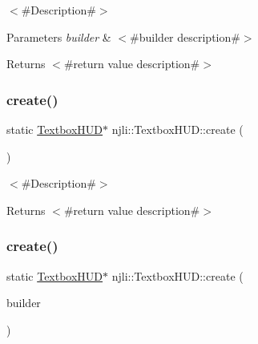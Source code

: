 $<$\#\+Description\#$>$


\begin{DoxyParams}{Parameters}
{\em builder} & $<$\#builder description\#$>$\\
\hline
\end{DoxyParams}
\begin{DoxyReturn}{Returns}
$<$\#return value description\#$>$ 
\end{DoxyReturn}
\mbox{\label{classnjli_1_1_textbox_h_u_d_a12780be5e88bf1829b91df685121d068}} 
\subsubsection{\texorpdfstring{create()}{create()}\hspace{0.1cm}{\footnotesize\ttfamily [2/3]}}
{\footnotesize\ttfamily static \mbox{\hyperlink{classnjli_1_1_textbox_h_u_d}{Textbox\+H\+UD}}$\ast$ njli\+::\+Textbox\+H\+U\+D\+::create (\begin{DoxyParamCaption}{ }\end{DoxyParamCaption})\hspace{0.3cm}{\ttfamily [static]}}

$<$\#\+Description\#$>$

\begin{DoxyReturn}{Returns}
$<$\#return value description\#$>$ 
\end{DoxyReturn}
\mbox{\label{classnjli_1_1_textbox_h_u_d_ab9ba8a1697760d225f60832f188c0310}} 
\subsubsection{\texorpdfstring{create()}{create()}\hspace{0.1cm}{\footnotesize\ttfamily [3/3]}}
{\footnotesize\ttfamily static \mbox{\hyperlink{classnjli_1_1_textbox_h_u_d}{Textbox\+H\+UD}}$\ast$ njli\+::\+Textbox\+H\+U\+D\+::create (\begin{DoxyParamCaption}\item[{const \mbox{\hyperlink{classnjli_1_1_textbox_h_u_d_builder}{Textbox\+H\+U\+D\+Builder}} \&}]{builder }\end{DoxyParamCaption})\hspace{0.3cm}{\ttfamily [static]}}


